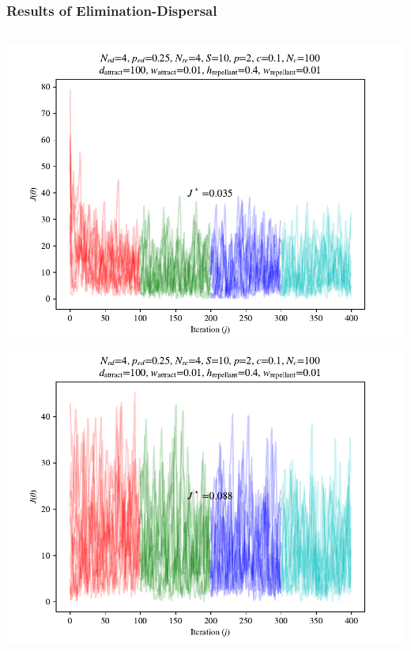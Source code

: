 \documentclass{beamer}
\begin{document}
\begin{frame}
\frametitle{Results of Elimination-Dispersal}
\begin{columns}[T]
    \begin{center}
      \includegraphics[scale=0.3]{assets/rastrigin_colony_ed_0_J}
      \includegraphics[scale=0.3]{assets/rastrigin_colony_ed_1_J}

\end{center}
\end{columns}
\end{frame}
\end{document}
